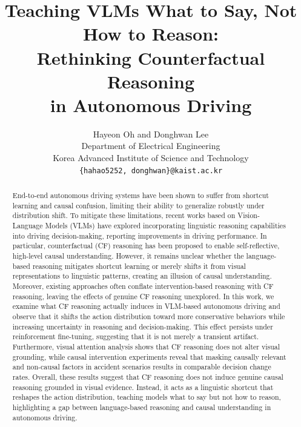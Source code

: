\documentclass{article}
\title{Teaching VLMs What to Say, Not How to Reason: \\Rethinking Counterfactual Reasoning \\in Autonomous Driving}
\author{%
  Hayeon Oh and Donghwan Lee \\
  Department of Electrical Engineering \\
  Korea Advanced Institute of Science and Technology \\
  \texttt{\{hahao5252, donghwan\}@kaist.ac.kr} \\
}
\begin{document}
\maketitle


\begin{abstract}
End-to-end autonomous driving systems have been shown to suffer from shortcut learning and causal confusion, limiting their ability to generalize robustly under distribution shift. To mitigate these limitations, recent works based on Vision-Language Models (VLMs) have explored incorporating linguistic reasoning capabilities into driving decision-making, reporting improvements in driving performance. In particular, counterfactual (CF) reasoning has been proposed to enable self-reflective, high-level causal understanding. However, it remains unclear whether the language-based reasoning mitigates shortcut learning or merely shifts it from visual representations to linguistic patterns, creating an illusion of causal understanding. Moreover, existing approaches often conflate intervention-based reasoning with CF reasoning, leaving the effects of genuine CF reasoning unexplored. In this work, we examine what CF reasoning actually induces in VLM-based autonomous driving and observe that it shifts the action distribution toward more conservative behaviors while increasing uncertainty in reasoning and decision-making. This effect persists under reinforcement fine-tuning, suggesting that it is not merely a transient artifact. Furthermore, visual attention analysis shows that CF reasoning does not alter visual grounding, while causal intervention experiments reveal that masking causally relevant and non-causal factors in accident scenarios results in comparable decision change rates. Overall, these results suggest that CF reasoning does not induce genuine causal reasoning grounded in visual evidence. Instead, it acts as a linguistic shortcut that reshapes the action distribution, teaching models what to say but not how to reason, highlighting a gap between language-based reasoning and causal understanding in autonomous driving.
\end{abstract}

\end{document}
